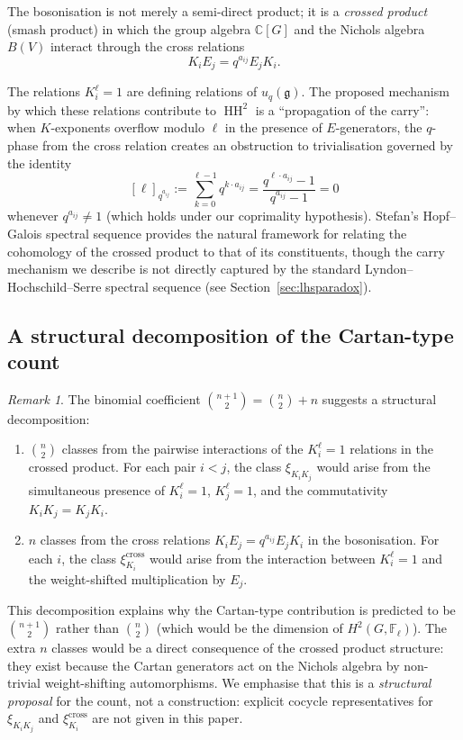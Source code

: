 \documentclass[11pt,letterpaper]{amsart}
\theoremstyle{plain}
\theoremstyle{definition}
\theoremstyle{remark}
\newtheorem{remark}[theorem]{Remark}
\newcommand{\HH}{\operatorname{HH}}
\newcommand{\CC}{\mathbb{C}}
\newcommand{\FF}{\mathbb{F}}
\begin{document}
The bosonisation is not merely a semi-direct product; it is a \emph{crossed product} (smash product) in which the group algebra $\CC[G]$ and the Nichols algebra $B(V)$ interact through the cross relations
\[
K_i E_j = q^{a_{ij}} E_j K_i.
\]

The relations $K_i^\ell = 1$ are defining relations of $u_q(\mathfrak{g})$. The proposed mechanism by which these relations contribute to $\HH^2$ is a ``propagation of the carry'': when $K$-exponents overflow modulo $\ell$ in the presence of $E$-generators, the $q$-phase from the cross relation creates an obstruction to trivialisation governed by the identity
\[
[\ell]_{q^{a_{ij}}} := \sum_{k=0}^{\ell-1} q^{k \cdot a_{ij}} = \frac{q^{\ell \cdot a_{ij}} - 1}{q^{a_{ij}} - 1} = 0
\]
whenever $q^{a_{ij}} \neq 1$ (which holds under our coprimality hypothesis). Stefan's Hopf--Galois spectral sequence\cite{St97} provides the natural framework for relating the cohomology of the crossed product to that of its constituents, though the carry mechanism we describe is not directly captured by the standard Lyndon--Hochschild--Serre spectral sequence (see Section~\ref{sec:lhsparadox}).

\subsection{A structural decomposition of the Cartan-type count}
\label{sec:cartandecomp}

\begin{remark}
The binomial coefficient $\binom{n+1}{2} = \binom{n}{2} + n$ suggests a structural decomposition:
\begin{enumerate}[label=(\alph*)]
\item $\binom{n}{2}$ classes from the pairwise interactions of the $K_i^\ell = 1$ relations in the crossed product. For each pair $i < j$, the class $\xi_{K_i K_j}$ would arise from the simultaneous presence of $K_i^\ell = 1$, $K_j^\ell = 1$, and the commutativity $K_i K_j = K_j K_i$.
\item $n$ classes from the cross relations $K_i E_j = q^{a_{ij}} E_j K_i$ in the bosonisation. For each $i$, the class $\xi_{K_i}^{\mathrm{cross}}$ would arise from the interaction between $K_i^\ell = 1$ and the weight-shifted multiplication by $E_j$.
\end{enumerate}
This decomposition explains why the Cartan-type contribution is predicted to be $\binom{n+1}{2}$ rather than $\binom{n}{2}$ (which would be the dimension of $H^2(G, \FF_\ell)$). The extra $n$ classes would be a direct consequence of the crossed product structure: they exist because the Cartan generators act on the Nichols algebra by non-trivial weight-shifting automorphisms. We emphasise that this is a \emph{structural proposal} for the count, not a construction: explicit cocycle representatives for $\xi_{K_i K_j}$ and $\xi_{K_i}^{\mathrm{cross}}$ are not given in this paper.
\end{remark}
\end{document}
